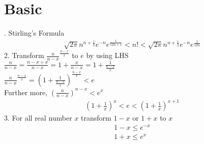 \section{Basic}
. Stirling's Formula
\begin{align}
    \nonumber \sqrt{2\pi}n^{n+\frac{1}{2}}e^{-n}e^{\frac{1}{12n+1}}< n! < \sqrt{2\pi}n^{n+\frac{1}{2}}e^{-n}e^{\frac{1}{12n}} 
\end{align}
2. Transform $\frac{n}{n-x}^{\frac{n-x}{x}}$ to $e$ by using LHS\\
$\frac{n}{n-x}=\frac{n-x+x}{n-x}=1+\frac{x}{n-x}=1+\frac{1}{\frac{n-x}{x}}$\\
$\frac{n}{n-x}^{\frac{n-x}{x}}=(1+\frac{1}{\frac{n-x}{x}})^{\frac{n-x}{x}} < e$\\
Further more, $(\frac{n}{n-x})^{n-x} < e^{x}$
\begin{align}
    \nonumber (1+\frac{1}{x})^{x} < e < (1+\frac{1}{x})^{x+1}
\end{align}
3. For all real number $x$ transform $1-x$ or $1+x$ to $x$
\begin{align}
    \nonumber 1-x \le e^{-x}\\
    \nonumber 1+x \le e^{x}
\end{align}